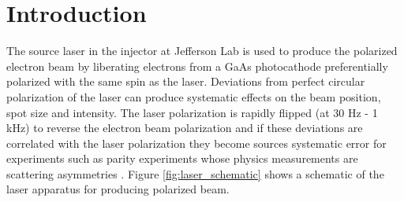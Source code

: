 \documentclass[12pt]{article}
\begin{document}
\section{Introduction}
The source laser in the injector at Jefferson Lab is used to produce the polarized electron beam by liberating electrons from a GaAs photocathode preferentially polarized with the same spin as the laser. Deviations from perfect circular polarization of the laser can produce systematic effects on the beam position, spot size and intensity. The laser polarization is rapidly flipped (at 30 Hz - 1 kHz) to reverse the electron beam polarization and if these deviations are correlated with the laser polarization they become sources systematic error for experiments such as parity experiments whose physics measurements are scattering asymmetries \cite{Paschke2007}.  Figure \ref{fig:laser_schematic} shows a schematic of the laser apparatus for producing polarized beam.
\end{document}
